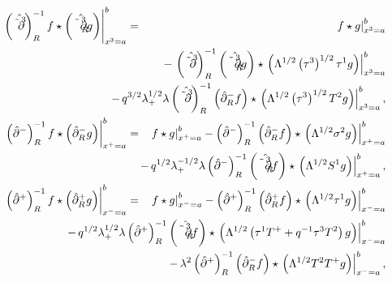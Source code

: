 \documentclass[a4paper,11pt,oneside]{article}
\begin{document}
\begin{eqnarray}
\left. \left( \hat{\tilde{\partial}^{3}}\right) _{R}^{-1}f\star \left( \hat{%
\tilde{\partial}_{R}^{3}}g\right) \right| _{x^{3}=a}^{b} &=&\left. f\star
g\right| _{x^{3}=a}^{b} \\
&&\hspace*{-2.9cm}-\,\left( \hat{\tilde{\partial}^{3}}\right)
_{R}^{-1}\left( \hat{\tilde{\partial}_{R}^{3}}g\right) \star \left. \left(
\Lambda ^{1/2}\left( \tau ^{3}\right) ^{1/2}\tau ^{1}g\right) \right|
_{x^{3}=a}^{b}  \nonumber \\
&&\hspace*{-2.9cm}-\,q^{3/2}\lambda _{+}^{1/2}\lambda \left( \hat{\tilde{%
\partial}^{3}}\right) _{R}^{-1}\left( \hat{\partial}_{R}^{-}f\right) \star
\left. \left( \Lambda ^{1/2}\left( \tau ^{3}\right) ^{1/2}T^{2}g\right)
\right| _{x^{3}=a}^{b},  \nonumber \\
\left. \left( \hat{\partial}^{-}\right) _{R}^{-1}f\star \left( \hat{\partial}%
_{R}^{-}g\right) \right| _{x^{+}=a}^{b} &=&\left. f\star g\right|
_{x^{+}=a}^{b}-\left( \hat{\partial}^{-}\right) _{R}^{-1}\left( \hat{\partial%
}_{R}^{-}f\right) \star \left. \left( \Lambda ^{1/2}\sigma ^{2}g\right)
\right| _{x^{+}=a}^{b}  \nonumber \\
&&\hspace*{-2.9cm}-\,q^{1/2}\lambda _{+}^{-1/2}\lambda \left( \hat{\partial}%
^{-}\right) _{R}^{-1}\left( \hat{\tilde{\partial}_{R}^{3}}f\right) \star
\left. \left( \Lambda ^{1/2}S^{1}g\right) \right| _{x^{+}=a}^{b},  \nonumber
\\
\left. \left( \hat{\partial}^{+}\right) _{R}^{-1}f\star \left( \hat{\partial}%
_{R}^{+}g\right) \right| _{x^{-}=a}^{b} &=&\left. f\star g\right|
_{x^{-}=a}^{b}-\left( \hat{\partial}^{+}\right) _{R}^{-1}\left( \hat{\partial%
}_{R}^{+}f\right) \star \left. \left( \Lambda ^{1/2}\tau ^{1}g\right)
\right| _{x^{-}=a}^{b}  \nonumber \\
&&\hspace*{-2.9cm}-\,q^{1/2}\lambda _{+}^{1/2}\lambda \left( \hat{\partial}%
^{+}\right) _{R}^{-1}\left( \hat{\tilde{\partial}_{R}^{3}}f\right) \star
\left. \left( \Lambda ^{1/2}\left( \tau ^{1}T^{+}+q^{-1}\tau
^{3}T^{2}\right) g\right) \right| _{x^{-}=a}^{b}  \nonumber \\
&&\hspace*{-2.9cm}-\,\lambda ^{2}\left( \hat{\partial}^{+}\right)
_{R}^{-1}\left( \hat{\partial}_{R}^{-}f\right) \star \left. \left( \Lambda
^{1/2}T^{2}T^{+}g\right) \right| _{x^{-}=a}^{b},  \nonumber \\

\end{eqnarray}
\end{document}
